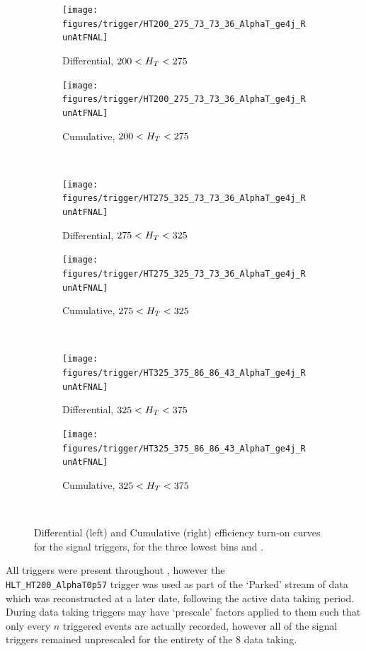 \begin{figure}[!ht]
  \centering
    
    \begin{subfigure}[b]{0.48\textwidth}
      \texttt{[image: figures/trigger/HT200\_275\_73\_73\_36\_AlphaT\_ge4j\_RunAtFNAL]}
      \caption{Differential, $200 < H_T < 275 $ \gev}
    \end{subfigure}
    \begin{subfigure}[b]{0.48\textwidth}
      \texttt{[image: figures/trigger/HT200\_275\_73\_73\_36\_AlphaT\_ge4j\_RunAtFNAL]}
      \caption{Cumulative, $200 < H_T < 275 $ \gev}
    \end{subfigure} \\
    \begin{subfigure}[b]{0.48\textwidth}
      \texttt{[image: figures/trigger/HT275\_325\_73\_73\_36\_AlphaT\_ge4j\_RunAtFNAL]}
      \caption{Differential, $275 < H_T < 325 $ \gev}
    \end{subfigure}
    \begin{subfigure}[b]{0.48\textwidth}
      \texttt{[image: figures/trigger/HT275\_325\_73\_73\_36\_AlphaT\_ge4j\_RunAtFNAL]}
      \caption{Cumulative, $275 < H_T < 325 $ \gev}
    \end{subfigure} \\
    \begin{subfigure}[b]{0.48\textwidth}
      \texttt{[image: figures/trigger/HT325\_375\_86\_86\_43\_AlphaT\_ge4j\_RunAtFNAL]}
      \caption{Differential, $325 < H_T < 375 $ \gev}
    \end{subfigure}
    \begin{subfigure}[b]{0.48\textwidth}
      \texttt{[image: figures/trigger/HT325\_375\_86\_86\_43\_AlphaT\_ge4j\_RunAtFNAL]}
      \caption{Cumulative, $325 < H_T < 375 $ \gev}
    \end{subfigure} \\
  
    \caption{\label{fig:eff_alphat_ge4j}
      Differential (left) and Cumulative (right) efficiency turn-on curves for 
      the signal triggers, for the three lowest \HT bins and \njhigh.}
\end{figure}

All triggers were present throughout \runone, however the 
\\\verb!HLT_HT200_AlphaT0p57! trigger was used as part of the `Parked' stream of 
data which was reconstructed at a later date, following the active data taking 
period. During data taking triggers may have `prescale' factors applied to them 
such that only every $n$ triggered events are actually recorded, however all of
the signal triggers remained unprescaled for the entirety of the 8 \tev
data taking.


